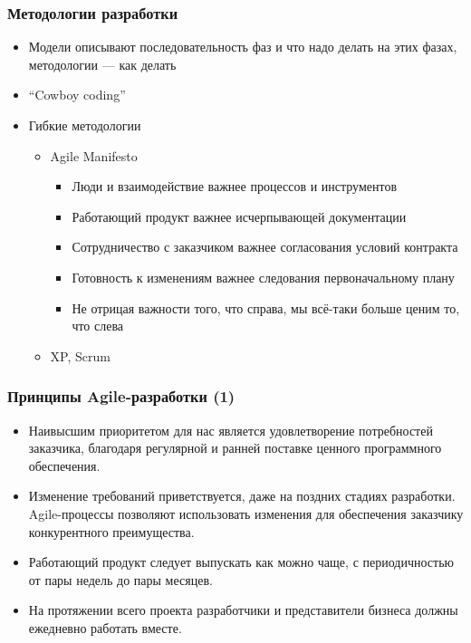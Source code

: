 \documentclass[xetex,mathserif,serif]{beamer}
\begin{document}
    \begin{frame}
        \frametitle{Методологии разработки}
        \begin{itemize}
            \item Модели описывают последовательность фаз и что надо делать на этих фазах, методологии --- как делать
            \item ``Cowboy coding''
            \item Гибкие методологии
            \begin{itemize}
                \item Agile Manifesto
                \begin{itemize}
                    \item Люди и взаимодействие важнее процессов и инструментов
                    \item Работающий продукт важнее исчерпывающей документации
                    \item Сотрудничество с заказчиком важнее согласования условий контракта
                    \item Готовность к изменениям важнее следования первоначальному плану
                    \item Не отрицая важности того, что справа, мы всё-таки больше ценим то, что слева
                \end{itemize}
                \item XP, Scrum
            \end{itemize}
        \end{itemize}
    \end{frame}

    \begin{frame}
        \frametitle{Принципы Agile-разработки (1)}
        \begin{itemize}
            \item Наивысшим приоритетом для нас является удовлетворение потребностей заказчика, благодаря регулярной и ранней поставке ценного программного обеспечения.
            \item Изменение требований приветствуется, даже на поздних стадиях разработки. Agile-процессы позволяют использовать изменения для обеспечения заказчику конкурентного преимущества.
            \item Работающий продукт следует выпускать как можно чаще, с периодичностью от пары недель до пары месяцев.
            \item На протяжении всего проекта разработчики и представители бизнеса должны ежедневно работать вместе.
        \end{itemize}
    \end{frame}
\end{document}
